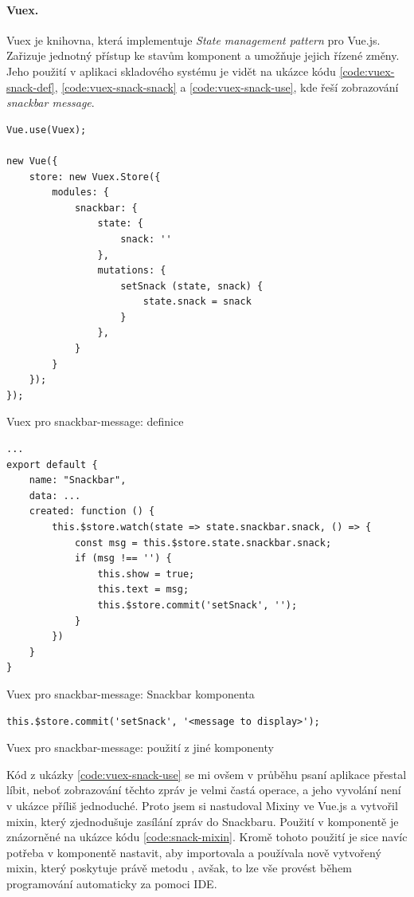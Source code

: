 \paragraph{Vuex.} Vuex \cite{vuex} je knihovna, která implementuje \emph{State management pattern} pro Vue.js. Zařizuje jednotný přístup ke stavům komponent a umožňuje jejich řízené změny. Jeho použití v aplikaci skladového systému je vidět na ukázce kódu \ref{code:vuex-snack-def}, \ref{code:vuex-snack-snack} a \ref{code:vuex-snack-use}, kde řeší zobrazování \emph{snackbar message}.

\begin{listing}[h]
\begin{verbatim}
Vue.use(Vuex);

new Vue({
    store: new Vuex.Store({
        modules: {
            snackbar: {
                state: {
                    snack: ''
                },
                mutations: {
                    setSnack (state, snack) {
                        state.snack = snack
                    }
                },
            }
        }
    });
});
\end{verbatim}
\caption{Vuex pro snackbar-message: definice} \label{code:vuex-snack-def}
\end{listing}

\begin{listing}[h]
\begin{verbatim}
...
export default {
    name: "Snackbar",
    data: ...
    created: function () {
        this.$store.watch(state => state.snackbar.snack, () => {
            const msg = this.$store.state.snackbar.snack;
            if (msg !== '') {
                this.show = true;
                this.text = msg;
                this.$store.commit('setSnack', '');
            }
        })
    }
}
\end{verbatim}
\caption{Vuex pro snackbar-message: Snackbar komponenta} \label{code:vuex-snack-snack}
\end{listing}

\begin{listing}[h]
\begin{verbatim}
this.$store.commit('setSnack', '<message to display>');
\end{verbatim}
\caption{Vuex pro snackbar-message: použití z jiné komponenty} \label{code:vuex-snack-use}
\end{listing}

Kód z ukázky \ref{code:vuex-snack-use} se mi ovšem v průběhu psaní aplikace přestal líbit, neboť zobrazování těchto zpráv je velmi častá operace, a jeho vyvolání není v ukázce příliš jednoduché. Proto jsem si nastudoval Mixiny ve Vue.js \cite{vue-mixins} a vytvořil mixin, který zjednodušuje zasílání zpráv do Snackbaru. Použití v komponentě je znázorněné na ukázce kódu \ref{code:snack-mixin}. Kromě tohoto použití je sice navíc potřeba v komponentě nastavit, aby importovala a používala nově vytvořený mixin, který poskytuje právě metodu , avšak, to lze vše provést během programování automaticky za pomoci IDE.

